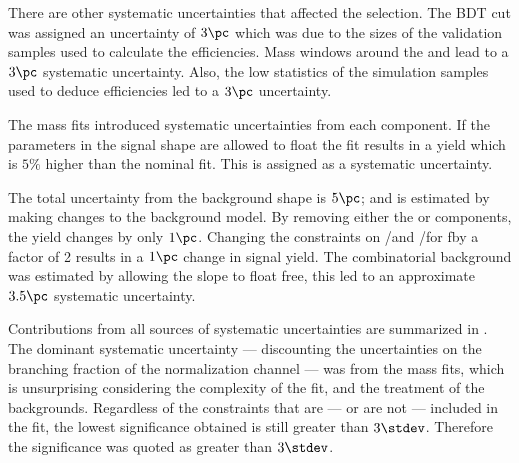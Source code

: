 There are other systematic uncertainties that affected the selection.
The BDT cut was assigned an uncertainty of $3\pc$ which was due to the sizes of the
validation samples used to calculate the efficiencies.
Mass windows around the \Ds and \phii lead to a $3\pc$ systematic uncertainty.
Also, the low statistics of the simulation samples used to deduce efficiencies led to a $3\pc$
uncertainty.

The mass fits introduced systematic uncertainties from each component.
If the parameters in the signal shape are allowed to float the fit results in a yield which is
$5\%$ higher than the nominal fit.
This is assigned as a systematic uncertainty.


The total uncertainty from the background shape is $5\pc$; and is estimated by making changes to
the background model.
By removing either the \btodsstrphi or \bstodsstrkstrk components, the yield changes by only $1\pc$.
Changing the constraints on \rA/\rB and \rC/\rD for \bstodskstrk fby a factor of 2 results in a
$1\pc$ change in signal yield.
The combinatorial background was estimated by allowing the slope to float free, this led to an
approximate $3.5\pc$ systematic uncertainty.


Contributions from all sources of systematic uncertainties are summarized in .
The dominant systematic uncertainty --- discounting the uncertainties on the branching fraction of
the normalization channel --- was from the mass fits, which is unsurprising considering the
complexity of the fit, and the treatment of the backgrounds.
Regardless of the constraints that are --- or are not --- included in the fit, the lowest
significance obtained is still greater than $3\stdev$.
Therefore the significance was quoted as greater than $3\stdev$.

